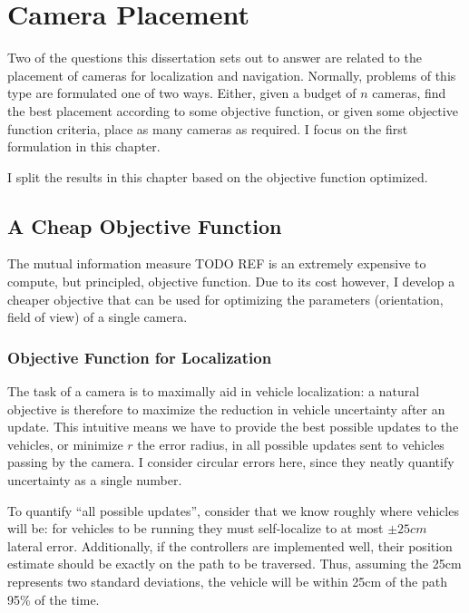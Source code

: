 \documentclass[a4paper,12pt,twoside,openright]{report}
\begin{document}
\chapter{Camera Placement}
\label{chap:cameraplacement}

Two of the questions this dissertation sets out to answer
are related to the placement of cameras for localization and navigation.
Normally, problems of this type are formulated one of two ways. Either,
given a budget of $n$ cameras, find the best placement according to
some objective function, or given some objective function criteria,
place as many cameras as required. I focus on the first formulation
in this chapter.

I split the results in this chapter based on the objective
function optimized.

\section{A Cheap Objective Function}
\label{cameraplacement:cheap}

The mutual information measure TODO REF is an extremely expensive to compute,
but principled, objective function. Due to its cost however, I
develop a cheaper objective that can be used for optimizing
the parameters (orientation, field of view) of a single camera.


\subsection{Objective Function for Localization}

The task of a camera is to maximally aid in vehicle localization: a natural
objective is therefore to maximize the reduction in vehicle uncertainty
after an update. This intuitive means we have to provide the best possible
updates to the vehicles, or minimize $r$ the error radius, in all possible updates sent to vehicles
passing by the camera. I consider circular errors here,
since they neatly quantify uncertainty as a single number.

To quantify ``all possible updates'', consider that we know roughly where vehicles will be: 
for vehicles to be running they must self-localize to at most $\pm25cm$ lateral error. 
Additionally, if the controllers are implemented well, their position estimate should be exactly on the path
to be traversed. Thus, assuming the 25cm represents two standard deviations,
the vehicle will be within 25cm of the path 95\% of the time.
\end{document}
